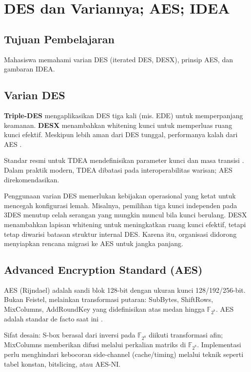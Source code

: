 \documentclass[../main.tex]{subfiles}
\begin{document}
\chapter{DES dan Variannya; AES; IDEA}

\section{Tujuan Pembelajaran}
Mahasiswa memahami varian DES (iterated DES, DESX), prinsip AES, dan gambaran IDEA.

\section{Varian DES}
\textbf{Triple-DES} mengaplikasikan DES tiga kali (mis. EDE) untuk memperpanjang keamanan. \textbf{DESX} menambahkan whitening kunci untuk memperluas ruang kunci efektif. Meskipun lebih aman dari DES tunggal, performanya kalah dari AES \citep{stallings}.

Standar resmi untuk TDEA mendefinisikan parameter kunci dan masa transisi \citep{nist_sp_800_67r2}. Dalam praktik modern, TDEA dibatasi pada interoperabilitas warisan; AES direkomendasikan.

Penggunaan varian DES memerlukan kebijakan operasional yang ketat untuk mencegah konfigurasi lemah. Misalnya, pemilihan tiga kunci independen pada 3DES menutup celah serangan yang mungkin muncul bila kunci berulang. DESX menambahkan lapisan whitening untuk meningkatkan ruang kunci efektif, tetapi tetap diwarisi batasan struktur internal DES. Karena itu, organisasi didorong menyiapkan rencana migrasi ke AES untuk jangka panjang.

\section{Advanced Encryption Standard (AES)}
AES (Rijndael) adalah sandi blok 128-bit dengan ukuran kunci 128/192/256-bit. Bukan Feistel, melainkan transformasi putaran: SubBytes, ShiftRows, MixColumns, AddRoundKey yang didefinisikan atas medan hingga \(\mathbb{F}_{2^8}\). AES adalah standar de facto saat ini \citep{nist_aes}.

Sifat desain: S-box berasal dari inversi pada \(\mathbb{F}_{2^8}\) diikuti transformasi afin; MixColumns memberikan difusi melalui perkalian matriks di \(\mathbb{F}_{2^8}\). Implementasi perlu menghindari kebocoran side-channel (cache/timing) melalui teknik seperti tabel konstan, bitslicing, atau AES-NI.
\end{document}
